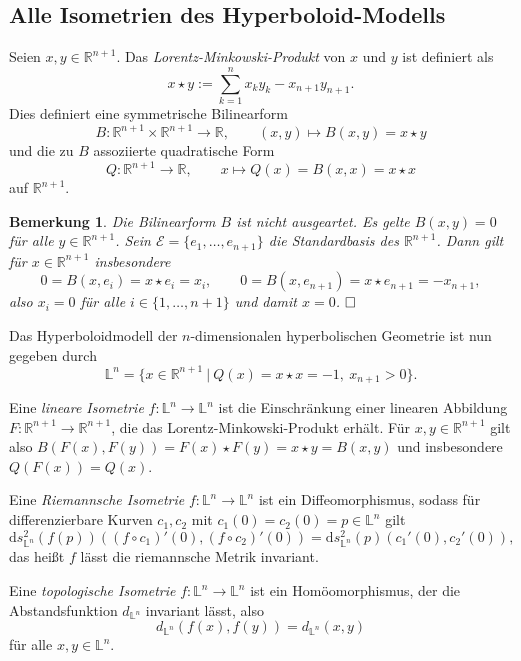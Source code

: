\documentclass[11pt]{book}
\numberwithin{dummy}{section}
\newtheorem{remark}[theorem]{Bemerkung}
\theoremstyle{nonumberbreak}
\newenvironment{defin}[1][]{\ifthenelse{\equal{#1}{}}{\definition}{\definition[#1]}\rm}{\enddefinition}
\newenvironment{pr}[1][]{\ifthenelse{\equal{#1}{}}{\proof}{\proof[#1]}\rm}{\endproof}
\newcommand{\Loid}{\mathbb{L}}
\newcommand{\R}{\mathbb{R}}
\newcommand{\la}{\longrightarrow}
\begin{document}
\begin{spacing}{1.4}
\section{Alle Isometrien des Hyperboloid-Modells} %




Seien $x,y \in \R^{n+1}$. Das \textit{Lorentz-Minkowski-Produkt} von $x$ und $y$ ist definiert als 
$$x \star y := \sum_{k=1}^n x_ky_k - x_{n+1}y_{n+1}.$$
Dies definiert eine symmetrische Bilinearform
$$B: \R^{n+1} \times \R^{n+1} \la \R, \qquad (x,y) \mapsto B(x,y)= x \star y$$
und die zu $B$ assoziierte quadratische Form 
$$Q: \R^{n+1} \la \R, \qquad x \mapsto Q(x)=B(x,x)= x \star x$$
auf $\R^{n+1}$.

\begin{remark}
Die Bilinearform $B$ ist nicht ausgeartet.
\begin{pr}
Es gelte $B(x,y)=0$ für alle $y \in \R^{n+1}$. Sein $\mathcal{E}=\{e_1, \ldots, e_{n+1}\}$ die Standardbasis des $\R^{n+1}$. Dann gilt für $x \in \R^{n+1}$ insbesondere
$$0= B(x,e_i)= x \star e_i = x_i, \qquad 0 = B(x,e_{n+1}) = x\star e_{n+1} = -x_{n+1},$$
also $x_i=0$ für alle $i \in \{1, \ldots, n+1\}$ und damit $x=0$. $\hfill \Box$
\end{pr}
\end{remark}

Das Hyperboloidmodell der $n$-dimensionalen hyperbolischen Geometrie ist nun gegeben durch 
$$\Loid^n = \{ x \in \R^{n+1} \ \vert \ Q(x) = x \star x = -1, \ x_{n+1}>0\}.$$

\begin{defin}
\begin{compactenum}
\item Eine \textit{lineare Isometrie} $f: \Loid^n \la \Loid^n$ ist die Einschränkung einer linearen Abbildung $F: \R^{n+1} \la \R^{n+1}$, die das Lorentz-Minkowski-Produkt erhält. Für $x,y \in \R^{n+1}$ gilt also $B(F(x), F(y)) = F(x) \star F(y) = x \star y = B(x,y)$ und insbesondere $Q(F(x)) = Q(x)$.
\item Eine \textit{Riemannsche Isometrie} $f: \Loid^n \la \Loid^n$ ist ein Diffeomorphismus, sodass für differenzierbare Kurven $c_1, c_2$ mit $c_1(0) = c_2(0) = p \in \Loid^n$ gilt 
$$\mathrm{d}s_{\Loid^n}^2(f(p)) \left( (f \circ c_1)'(0), (f \circ c_2)'(0) \right) = \mathrm{d}s_{\Loid^n}^2(p)(c_1'(0), c_2'(0)),$$
das heißt $f$ lässt die riemannsche Metrik invariant.
\item Eine \textit{topologische Isometrie} $f: \Loid^n \la \Loid^n$ ist ein Homöomorphismus, der die Abstandsfunktion $d_{\Loid^n}$ invariant lässt, also 
$$d_{\Loid^n}\left( f(x), f(y) \right) = d_{\Loid^n}(x,y)$$
für alle $x,y \in \Loid^n$. 


\end{compactenum}
\end{defin}
\end{spacing}
\end{document}

